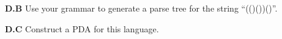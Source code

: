 \documentclass[10pt]{article}
\begin{document}


\noindent
\textbf{D.B} Use your grammar to generate a parse tree for the string ``(()())()''.




\noindent
\textbf{D.C} Construct a PDA for this language.



    
    
\end{document}
